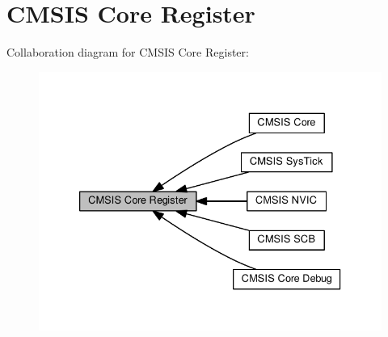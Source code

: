 \hypertarget{group___c_m_s_i_s__core__register}{}\section{C\+M\+S\+IS Core Register}
\label{group___c_m_s_i_s__core__register}
Collaboration diagram for C\+M\+S\+IS Core Register\+:\nopagebreak
\begin{figure}[H]
\begin{center}
\leavevmode
\includegraphics[width=333pt]{group___c_m_s_i_s__core__register}
\end{center}
\end{figure}
